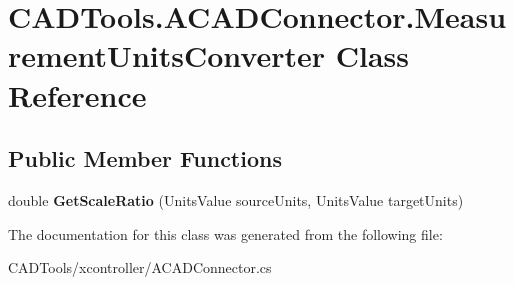 \hypertarget{class_c_a_d_tools_1_1_a_c_a_d_connector_1_1_measurement_units_converter}{}\section{C\+A\+D\+Tools.\+A\+C\+A\+D\+Connector.\+Measurement\+Units\+Converter Class Reference}
\label{class_c_a_d_tools_1_1_a_c_a_d_connector_1_1_measurement_units_converter}
\subsection*{Public Member Functions}
\begin{DoxyCompactItemize}
\item 
\mbox{\label{class_c_a_d_tools_1_1_a_c_a_d_connector_1_1_measurement_units_converter_af98225abb55469bf9cacb76caf748330}} 
double {\bfseries Get\+Scale\+Ratio} (Units\+Value source\+Units, Units\+Value target\+Units)
\end{DoxyCompactItemize}


The documentation for this class was generated from the following file\+:\begin{DoxyCompactItemize}
\item 
C\+A\+D\+Tools/xcontroller/A\+C\+A\+D\+Connector.\+cs\end{DoxyCompactItemize}
